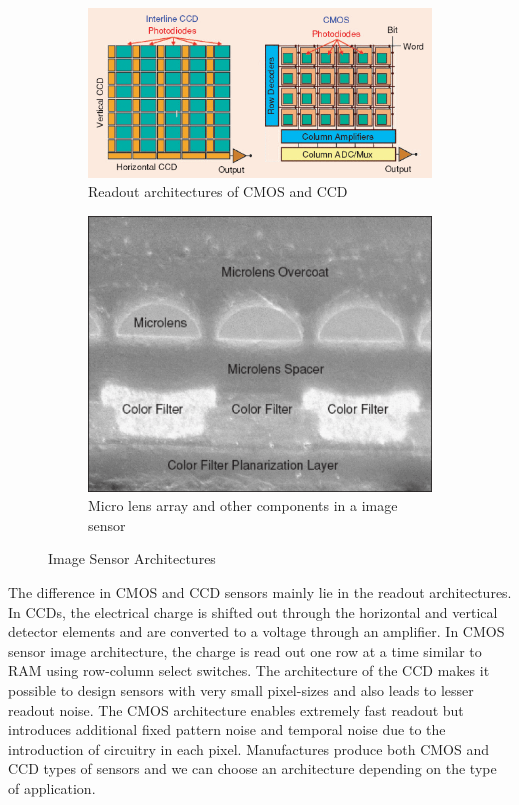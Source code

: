 \begin{figure}[ht]
\centering
\begin{subfigure}{\textwidth}
  \centering
  \includegraphics[width=\linewidth]{pics/cmos/cmosccd}
  \caption{Readout architectures of CMOS and CCD}
  \label{fig:cmos_ccd}
\end{subfigure}
\begin{subfigure}{0.75\textwidth}
  \centering
  \includegraphics[width=.75\linewidth]{pics/cmos/cmosmicro}
  \caption{Micro lens array and other components in a image sensor}
  \label{fig:cmos_micro}
\end{subfigure}
\caption{Image Sensor Architectures\cite{cmos}}
\label{fig:cmos_1}
\end{figure}

The difference in CMOS and CCD sensors mainly lie in the readout architectures. In CCDs, the electrical charge is shifted out through the horizontal and vertical detector elements and are converted to a voltage through an amplifier. In CMOS sensor image architecture, the charge is read out one row at a time similar to RAM using row-column select switches\cite{cmos}. The architecture of the CCD makes it possible to design sensors with very small pixel-sizes and also leads to lesser readout noise. The CMOS architecture enables extremely fast readout but introduces additional fixed pattern noise and temporal noise due to the introduction of circuitry in each pixel. Manufactures produce both CMOS and CCD types of sensors and we can choose an architecture depending on the type of application. 

